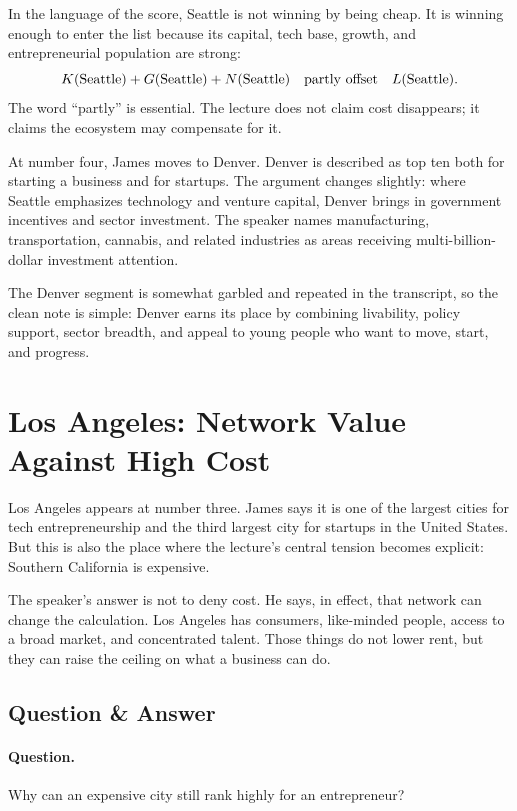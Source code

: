 In the language of the score, Seattle is not winning by being cheap. It is winning enough to enter the list because its capital, tech base, growth, and entrepreneurial population are strong:
\begin{equation}
K(\text{Seattle})+G(\text{Seattle})+N(\text{Seattle})
\quad \hbox{partly offset} \quad
L(\text{Seattle}).
\end{equation}
The word ``partly'' is essential. The lecture does not claim cost disappears; it claims the ecosystem may compensate for it.

At number four, James moves to Denver. Denver is described as top ten both for starting a business and for startups. The argument changes slightly: where Seattle emphasizes technology and venture capital, Denver brings in government incentives and sector investment. The speaker names manufacturing, transportation, cannabis, and related industries as areas receiving multi-billion-dollar investment attention.

The Denver segment is somewhat garbled and repeated in the transcript, so the clean note is simple: Denver earns its place by combining livability, policy support, sector breadth, and appeal to young people who want to move, start, and progress.

\section{Los Angeles: Network Value Against High Cost}

Los Angeles appears at number three. James says it is one of the largest cities for tech entrepreneurship and the third largest city for startups in the United States. But this is also the place where the lecture's central tension becomes explicit: Southern California is expensive.

The speaker's answer is not to deny cost. He says, in effect, that network can change the calculation. Los Angeles has consumers, like-minded people, access to a broad market, and concentrated talent. Those things do not lower rent, but they can raise the ceiling on what a business can do.

\subsection{Question \& Answer}

\paragraph{Question.}
Why can an expensive city still rank highly for an entrepreneur?

